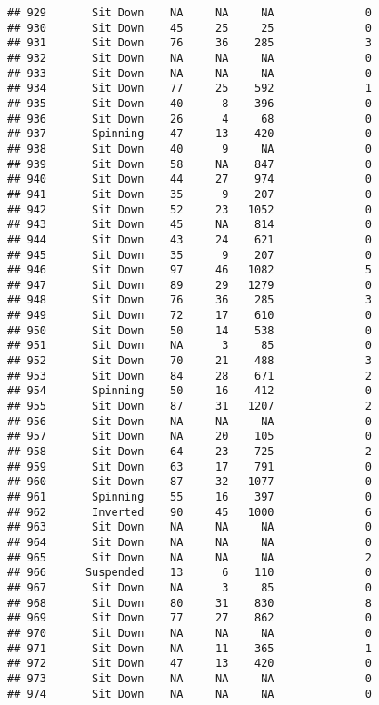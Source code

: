 \documentclass[
]{article}
\begin{document}
\begin{verbatim}
## 929       Sit Down    NA     NA     NA              0
## 930       Sit Down    45     25     25              0
## 931       Sit Down    76     36    285              3
## 932       Sit Down    NA     NA     NA              0
## 933       Sit Down    NA     NA     NA              0
## 934       Sit Down    77     25    592              1
## 935       Sit Down    40      8    396              0
## 936       Sit Down    26      4     68              0
## 937       Spinning    47     13    420              0
## 938       Sit Down    40      9     NA              0
## 939       Sit Down    58     NA    847              0
## 940       Sit Down    44     27    974              0
## 941       Sit Down    35      9    207              0
## 942       Sit Down    52     23   1052              0
## 943       Sit Down    45     NA    814              0
## 944       Sit Down    43     24    621              0
## 945       Sit Down    35      9    207              0
## 946       Sit Down    97     46   1082              5
## 947       Sit Down    89     29   1279              0
## 948       Sit Down    76     36    285              3
## 949       Sit Down    72     17    610              0
## 950       Sit Down    50     14    538              0
## 951       Sit Down    NA      3     85              0
## 952       Sit Down    70     21    488              3
## 953       Sit Down    84     28    671              2
## 954       Spinning    50     16    412              0
## 955       Sit Down    87     31   1207              2
## 956       Sit Down    NA     NA     NA              0
## 957       Sit Down    NA     20    105              0
## 958       Sit Down    64     23    725              2
## 959       Sit Down    63     17    791              0
## 960       Sit Down    87     32   1077              0
## 961       Spinning    55     16    397              0
## 962       Inverted    90     45   1000              6
## 963       Sit Down    NA     NA     NA              0
## 964       Sit Down    NA     NA     NA              0
## 965       Sit Down    NA     NA     NA              2
## 966      Suspended    13      6    110              0
## 967       Sit Down    NA      3     85              0
## 968       Sit Down    80     31    830              8
## 969       Sit Down    77     27    862              0
## 970       Sit Down    NA     NA     NA              0
## 971       Sit Down    NA     11    365              1
## 972       Sit Down    47     13    420              0
## 973       Sit Down    NA     NA     NA              0
## 974       Sit Down    NA     NA     NA              0

\end{verbatim}
\end{document}
